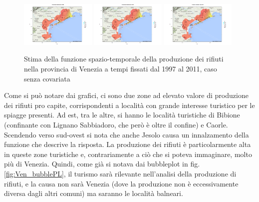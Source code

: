 \documentclass[a4paper,11pt,twoside,openright]{book}							%
\begin{document}
\begin{figure}[H]
	\includegraphics[trim=0cm 0cm 4cm 0cm,clip=true,width=0.32\textwidth]{Immagini/venezia_senza_covariate/Maps2009.png}
	\includegraphics[trim=0cm 0cm 4cm 0cm,clip=true,width=0.32\textwidth]{Immagini/venezia_senza_covariate/Maps2010.png}
	\includegraphics[trim=0cm 0cm 4cm 0cm,clip=true,width=0.32\textwidth]{Immagini/venezia_senza_covariate/Maps2011.png}
	\caption{Stima della funzione spazio-temporale della produzione dei rifiuti nella provincia di Venezia a tempi fissati dal 1997 al 2011, caso senza covariata}
	\label{fig:Ven_ris}
\end{figure}
\newpage
Come si può notare dai grafici, ci sono due zone ad elevato valore di produzione dei rifiuti pro capite, corrispondenti a località con grande interesse turistico per le spiagge presenti. Ad est, tra le altre, si hanno le località turistiche di Bibione (confinante con Lignano Sabbiadoro, che però è oltre il confine) e Caorle. Scendendo verso sud-ovest si nota che anche Jesolo causa un innalzamento della funzione che descrive la risposta. La produzione dei rifiuti è particolarmente alta in queste zone turistiche e, contrariamente a ciò che si poteva immaginare, molto più di Venezia. Quindi, come già si notava dai bubbleplot in fig. \ref{fig:Ven_bubblePL}, il turismo sarà rilevante nell'analisi della produzione di rifiuti, e la causa non sarà Venezia (dove la produzione non è eccessivamente diversa dagli altri comuni) ma saranno le località balneari.
\end{document}
